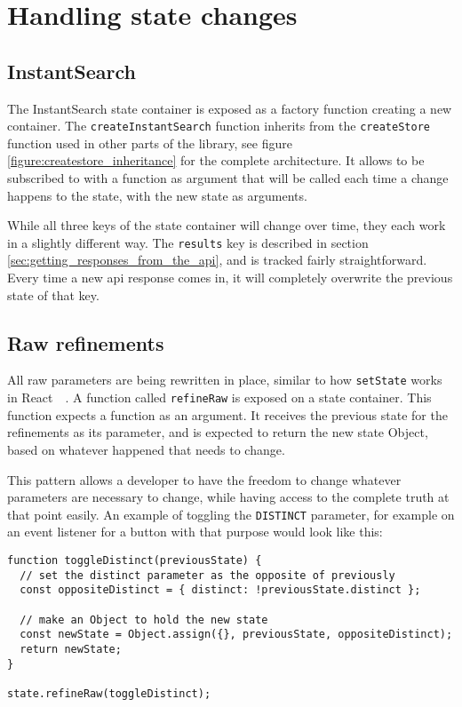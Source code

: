 
\section{Handling state changes} %
\label{sec:handling_state_changes}

\subsection{InstantSearch}
\label{ssec:instantsearch}

The InstantSearch state container is exposed as a factory function creating a new container. The {\tt createInstantSearch} function inherits from the {\tt createStore} function used in other parts of the \gls{library}, see figure \ref{figure:createstore_inheritance} for the complete architecture. It allows to be subscribed to with a function as argument that will be called each time a change happens to the state, with the new state as arguments.

While all three keys of the state container will change over time, they each work in a slightly different way. The {\tt results} key is described in section \ref{sec:getting_responses_from_the_api}, and is tracked fairly straightforward. Every time a new \acrshort{api} response comes in, it will completely overwrite the previous state of that key. 

\subsection{Raw \glspl{refinement}}
\label{ssec:raw-refinments}

All raw parameters are being rewritten in place, similar to how {\tt setState} works in React~\cite{react-doc-state}~. A function called {\tt refineRaw} is exposed on a state container. This function expects a function as an argument. It receives the previous state for the \glspl{refinement} as its parameter, and is expected to return the new state Object, based on whatever happened that needs to change.

This pattern allows a developer to have the freedom to change whatever parameters are necessary to change, while having access to the complete truth at that point easily. An example of toggling the {\tt DISTINCT} parameter, for example on an event listener for a button with that purpose would look like this:

\begin{minipage}{\linewidth}
\begin{lstlisting}[caption={Toggling the {\tt DISTINCT} parameter},label={lst:is-core-raw}]
function toggleDistinct(previousState) {
  // set the distinct parameter as the opposite of previously
  const oppositeDistinct = { distinct: !previousState.distinct };

  // make an Object to hold the new state
  const newState = Object.assign({}, previousState, oppositeDistinct);
  return newState;
}

state.refineRaw(toggleDistinct);
\end{lstlisting}
\end{minipage}

